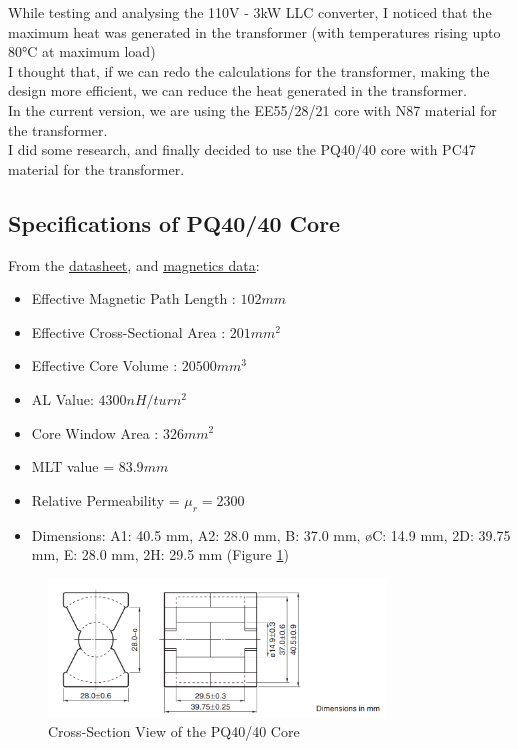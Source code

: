 While testing and analysing the 110V - 3kW LLC converter, I noticed that the maximum heat was generated in the transformer (with temperatures rising upto 80°C at maximum load)\\
I thought that, if we can redo the calculations for the transformer, making the design more efficient, we can reduce the heat generated in the transformer.\\
In the current version, we are using the EE55/28/21 core with N87 material for the transformer.\\
I did some research, and finally decided to use the PQ40/40 core with PC47 material for the transformer.
\subsection{Specifications of PQ40/40 Core}
From the \href{https://product.tdk.com/en/search/ferrite/ferrite/ferrite-core/info?part_no=PC47PQ40/40Z-12}{datasheet}, and \href{https://web.eecs.utk.edu/~dcostine/ECE482/Spring2014/materials/magnetics/MagneticsTables.pdf}{magnetics data}:
\begin{itemize}
    \item Effective Magnetic Path Length : $102 mm$
    \item Effective Cross-Sectional Area : $201 mm^2$
    \item Effective Core Volume : $20500 mm^3$
    \item AL Value: $4300 nH/turn^2$
    \item Core Window Area : $326 mm^2$
    \item MLT value = $83.9mm$
    \item Relative Permeability = $\mu_r = 2300$
    \item Dimensions: A1: 40.5 mm, A2: 28.0 mm, B: 37.0 mm, øC: 14.9 mm, 2D: 39.75 mm, E: 28.0 mm, 2H: 29.5 mm (Figure \ref{fig:image3})
\end{itemize}
\begin{figure}[H]
    \centering
    \includegraphics[width=0.8\textwidth]{images/image3.png}
    \caption{Cross-Section View of the PQ40/40 Core}
    \label{fig:image3}
\end{figure}

